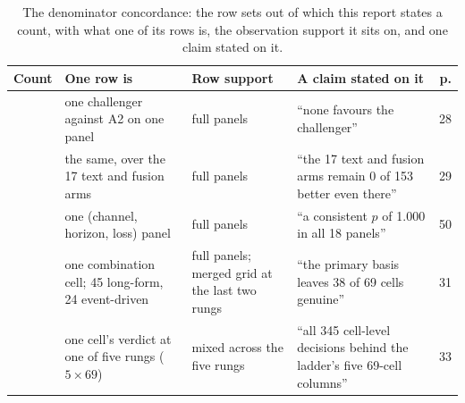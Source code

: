 \begin{table}[p]
\centering
\caption[The denominator concordance]{The denominator concordance: the row
sets out of which this report states a count, with what one of its rows is, the
observation support it sits on, and one claim stated on it.}
\label{tab:app-denominators}
\singlespacing\footnotesize
\setlength{\tabcolsep}{3pt}
\begin{tabular}{@{}>{\raggedright\arraybackslash}p{}>{\raggedright\arraybackslash}p{}>{\raggedright\arraybackslash}p{}>{\raggedright\arraybackslash}p{}r@{}}
\toprule
Count & One row is & Row support & A claim stated on it & p. \\
\midrule
\addlinespace
180 & one challenger against A2 on one panel & full panels & ``none favours the challenger'' & 28 \\ %
153 & the same, over the 17 text and fusion arms & full panels & ``the 17 text and fusion arms remain 0 of 153 better even there'' & 29 \\ %
18 & one (channel, horizon, loss) panel & full panels & ``a consistent $p$ of 1.000 in all 18 panels'' & 50 \\ %
\addlinespace
69 & one combination cell; 45 long-form, 24 event-driven & full panels; merged grid at the last two rungs & ``the primary basis leaves 38 of 69 cells genuine'' & 31 \\ %
345 & one cell's verdict at one of five rungs ($5 \times 69$) & mixed across the five rungs & ``all 345 cell-level decisions behind the ladder's five 69-cell columns'' & 33 \\ %

\end{tabular}
\end{table}
